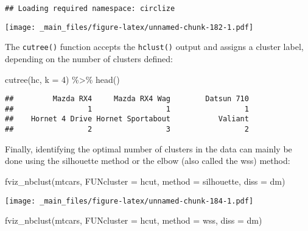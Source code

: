 \documentclass[
]{book}
\newenvironment{Shaded}{\begin{snugshade}}{\end{snugshade}}
\newcommand{\AttributeTok}[1]{\textcolor[rgb]{0.77,0.63,0.00}{#1}}
\newcommand{\DecValTok}[1]{\textcolor[rgb]{0.00,0.00,0.81}{#1}}
\newcommand{\FunctionTok}[1]{\textcolor[rgb]{0.00,0.00,0.00}{#1}}
\newcommand{\NormalTok}[1]{#1}
\newcommand{\SpecialCharTok}[1]{\textcolor[rgb]{0.00,0.00,0.00}{#1}}
\newcommand{\StringTok}[1]{\textcolor[rgb]{0.31,0.60,0.02}{#1}}
\begin{document}
\begin{verbatim}
## Loading required namespace: circlize
\end{verbatim}

\texttt{[image: \_main\_files/figure-latex/unnamed-chunk-182-1.pdf]}

The \texttt{cutree()} function accepts the \texttt{hclust()} output and assigns a cluster label, depending on the number of clusters defined:

\begin{Shaded}
\begin{Highlighting}[]
\FunctionTok{cutree}\NormalTok{(hc, }\AttributeTok{k =} \DecValTok{4}\NormalTok{) }\SpecialCharTok{\%\textgreater{}\%} \FunctionTok{head}\NormalTok{()}
\end{Highlighting}
\end{Shaded}

\begin{verbatim}
##         Mazda RX4     Mazda RX4 Wag        Datsun 710 
##                 1                 1                 1 
##    Hornet 4 Drive Hornet Sportabout           Valiant 
##                 2                 3                 2
\end{verbatim}

Finally, identifying the optimal number of clusters in the data can mainly be done using the silhouette method or the elbow (also called the wss) method:

\begin{Shaded}
\begin{Highlighting}[]
\FunctionTok{fviz\_nbclust}\NormalTok{(mtcars, }\AttributeTok{FUNcluster =}\NormalTok{ hcut,}
             \AttributeTok{method =} \StringTok{\textquotesingle{}silhouette\textquotesingle{}}\NormalTok{,}
             \AttributeTok{diss =}\NormalTok{ dm)}
\end{Highlighting}
\end{Shaded}

\texttt{[image: \_main\_files/figure-latex/unnamed-chunk-184-1.pdf]}

\begin{Shaded}
\begin{Highlighting}[]
\FunctionTok{fviz\_nbclust}\NormalTok{(mtcars, }\AttributeTok{FUNcluster =}\NormalTok{ hcut,}
             \AttributeTok{method =} \StringTok{\textquotesingle{}wss\textquotesingle{}}\NormalTok{,}
             \AttributeTok{diss =}\NormalTok{ dm)}
\end{Highlighting}
\end{Shaded}
\end{document}
